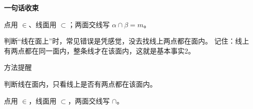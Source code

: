 \documentclass{exam-zh}
\begin{document}
\begin{eduDualExplain}
  \begin{eduExplainLeft}
  \end{eduExplainLeft}

  \begin{eduExplainRight}
    \vspace{1mm}
    {\color{edu-blue}\bfseries\small 一句话收束}\par\vspace{1mm}
    \begin{eduBulletList}
      \item 点用 $\in$、线面用 $\subset$；两面交线写 $\alpha\cap\beta=m$。    \end{eduBulletList}
  \end{eduExplainRight}
\end{eduDualExplain}




\begin{eduMistakeBox}
判断“线在面上”时，常见错误是凭感觉，没去找线上两点都在面内。
记住：线上有两点都在同一面内，整条线才在该面内，这就是基本事实2。
\end{eduMistakeBox}




\begin{eduSummaryBlock}{\eduIconPin}{方法提醒}
\begin{eduBulletList}
  \item 判断线在面内，只看线上是否有两点都在该面内。  \item 点用 $\in$，线面用 $\subset$，两面交线写 $\cap$。\end{eduBulletList}
\end{eduSummaryBlock}



\clearpage
{}
\end{document}
